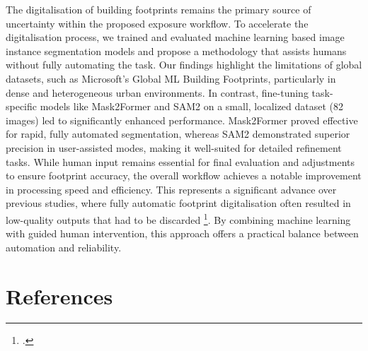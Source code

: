 \begin{refsection}
The digitalisation of building footprints remains the primary source of uncertainty within the proposed exposure workflow. To accelerate the digitalisation process, we trained and evaluated machine learning based image instance segmentation models and propose a methodology that assists humans without fully automating the task. Our findings highlight the limitations of global datasets, such as Microsoft’s Global ML Building Footprints, particularly in dense and heterogeneous urban environments. In contrast, fine-tuning task-specific models like Mask2Former and SAM2 on a small, localized dataset (82 images) led to significantly enhanced performance. Mask2Former proved effective for rapid, fully automated segmentation, whereas SAM2 demonstrated superior precision in user-assisted modes, making it well-suited for detailed refinement tasks. While human input remains essential for final evaluation and adjustments to ensure footprint accuracy, the overall workflow achieves a notable improvement in processing speed and efficiency. This represents a significant advance over previous studies, where fully automatic footprint digitalisation often resulted in low-quality outputs that had to be discarded \footcite{torres_using_2023, de_los_santos_gis-based_2021}. By combining machine learning with guided human intervention, this approach offers a practical balance between automation and reliability.


\newpage

\renewcommand{\sectionnametext}{References}
\renewcommand{\headingtextR}{\thesection. \sectionnametext}
\section{\sectionnametext}
\printbibliography[heading=none]

\end{refsection}